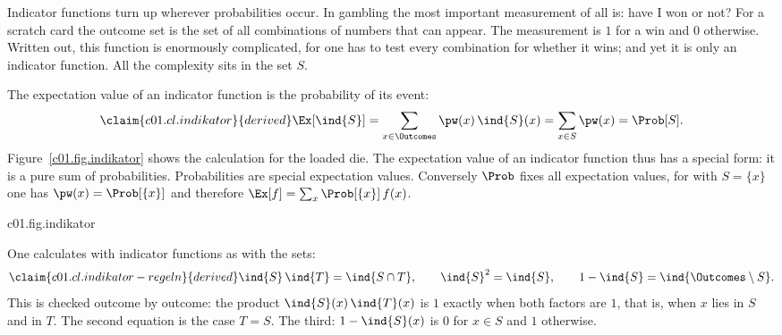 \begin{remark}
  Indicator functions turn up wherever probabilities occur. In gambling the most important
  measurement of all is: have I won or not? For a scratch card the outcome set is the set of
  all combinations of numbers that can appear. The measurement is $1$ for a win and $0$
  otherwise. Written out, this function is enormously complicated, for one has to test every
  combination for whether it wins; and yet it is only an indicator function. All the
  complexity sits in the set $S$.
\end{remark}

The expectation value of an indicator function is the probability of its event:
\begin{equation}\label{c01.eq.indikator}\claim{c01.cl.indikator}{derived}
  \Ex[\ind{S}] = \sum_{x \in \Outcomes} \pw(x)\, \ind{S}(x) = \sum_{x \in S} \pw(x) = \Prob[S] .
\end{equation}
Figure~\ref{c01.fig.indikator} shows the calculation for the loaded die. The expectation
value of an indicator function thus has a special form: it is a pure sum of probabilities.
Probabilities are special expectation values. Conversely $\Prob$ fixes all
expectation values, for with $S = \{x\}$ one has $\pw(x) = \Prob[\{x\}]$ and therefore
$\Ex[f] = \sum_{x} \Prob[\{x\}]\, f(x)$.

\begin{tpcfigure}{c01.fig.indikator}
  \caption{A yes-no measurement on the loaded die of equation~\eqref{c01.eq.gezinkt}.
    (a) The indicator function of the event $S = \{2,4,6\}$, dashed like all
    measurements. (b) The weights $\pw(x)$ (outlines) and the products $\pw(x)\,\ind{S}(x)$
    (hatched): the indicator function leaves only the bars over $S$. Their heights add
    up to $\Ex[\ind{S}] = \Prob[S] = \tfrac{7}{12}$.}
\end{tpcfigure}

One calculates with indicator functions as with the sets:
\begin{equation}\label{c01.eq.indikator-regeln}\claim{c01.cl.indikator-regeln}{derived}
  \ind{S}\,\ind{T} = \ind{S \cap T},
  \qquad
  \ind{S}^2 = \ind{S},
  \qquad
  1 - \ind{S} = \ind{\Outcomes \setminus S} .
\end{equation}
This is checked outcome by outcome: the product $\ind{S}(x)\,\ind{T}(x)$ is $1$ exactly
when both factors are $1$, that is, when $x$ lies in $S$ and in $T$. The second
equation is the case $T = S$. The third: $1 - \ind{S}(x)$ is $0$ for $x \in S$ and $1$
otherwise.


